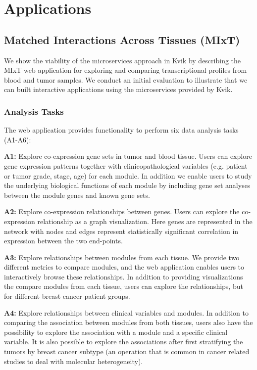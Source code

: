 \section{Applications} 

\subsection{Matched Interactions Across Tissues (MIxT)}
We show the viability of the microservices approach in Kvik by describing the
MIxT web application for exploring and comparing transcriptional profiles from
blood and tumor samples.  We conduct an initial evaluation to illustrate that we
can built interactive applications using the microservices provided by Kvik. 

\subsubsection{Analysis Tasks}
The web application provides functionality to perform six data analysis tasks
(A1-A6):

\textbf{A1:} Explore co-expression gene sets in tumor and blood tissue.  Users
can explore gene expression patterns together with clinicopathological variables
(e.g. patient or tumor grade, stage, age) for each module.  In addition we
enable users to study the underlying biological functions of each module by
including gene set analyses between the module genes and known gene sets. 

\textbf{A2:} Explore co-expression relationships between genes. Users can
explore the co-expression relationship as a graph visualization. 
Here genes are represented in the network with nodes and edges represent 
statistically significant correlation in expression between the two end-points. 

\textbf{A3:} Explore relationships between modules from each tissue. We provide
two different metrics to compare modules, and the web application enables users
to interactively browse these relationships.  In addition to providing
visualizations the compare modules from each tissue, users can explore the
relationships, but for different breast cancer patient groups. 

\textbf{A4:} Explore relationships between clinical variables and modules. In
addition to comparing the association between modules from both tissues, users
also have the possibility to explore the association with a module and a
specific clinical variable. It is also possible to explore the associations
after first stratifying the tumors by breast cancer subtype (an operation that
is common in cancer related studies to deal with molecular heterogeneity).

